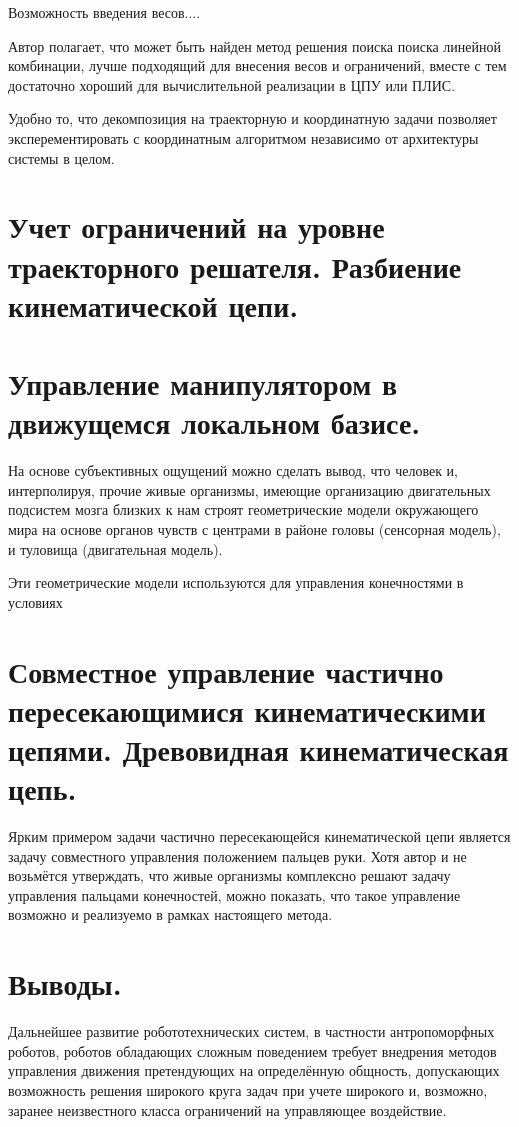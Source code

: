 \documentclass[12pt,a4paper,titlepage]{article}
\begin{document}
Возможность введения весов....

Автор полагает, что может быть найден метод решения поиска поиска линейной комбинации, лучше подходящий для внесения весов и ограничений, вместе с тем достаточно хороший для вычислительной реализации в ЦПУ или ПЛИС. 

Удобно то, что декомпозиция на траекторную и координатную задачи позволяет эксперементировать с координатным алгоритмом независимо от архитектуры системы в целом.

\newpage
\section{Учет ограничений на уровне траекторного решателя. Разбиение кинематической цепи.}

\newpage
\section{Управление манипулятором в движущемся локальном базисе.}
На основе субъективных ощущений можно сделать вывод, что человек и, интерполируя, прочие живые организмы, имеющие организацию двигательных подсистем мозга близких к нам строят геометрические модели окружающего мира на основе органов чувств с центрами в районе головы (сенсорная модель), и туловища (двигательная модель).

Эти геометрические модели используются для управления конечностями в условиях

\newpage 
\section{Совместное управление частично пересекающимися кинематическими цепями. Древовидная кинематическая цепь.}

Ярким примером задачи частично пересекающейся кинематической цепи является задачу совместного управления положением пальцев руки. Хотя автор и не возьмётся утверждать, что живые организмы комплексно решают задачу управления пальцами конечностей, можно показать, что такое управление возможно и реализуемо в рамках настоящего метода.

\newpage
\section{Выводы.}
Дальнейшее развитие робототехнических систем, в частности антропоморфных роботов, роботов обладающих сложным поведением требует внедрения методов управления движения претендующих на определённую общность, допускающих возможность решения широкого круга задач при учете широкого и, возможно, заранее неизвестного класса ограничений на управляющее воздействие.
\end{document}
